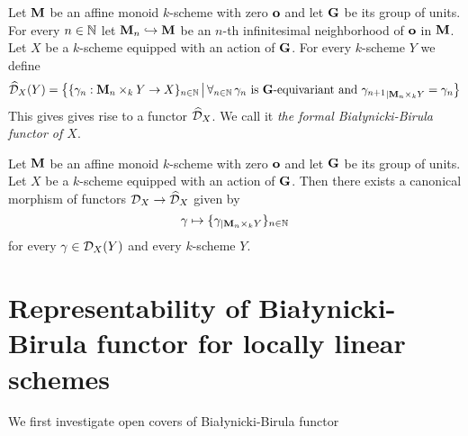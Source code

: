 \begin{definition}
Let $\mathbf{M}$ be an affine monoid $k$-scheme with zero $\mathbf{o}$ and let $\mathbf{G}$ be its group of units. For every $n\in {\mathbb N}$ let $\mathbf{M}_n\hookrightarrow \mathbf{M}$ be an $n$-th infinitesimal neighborhood of $\mathbf{o}$ in $\mathbf{M}$. Let $X$ be a $k$-scheme equipped with an action of $\mathbf{G}$. For every $k$-scheme $Y$ we define
$$\widehat{{\mathcal D}}_X(Y) = \big\{\{\gamma_n:\mathbf{M}_n\times_kY\rightarrow X\}_{n\in {\mathbb N}}\,\big|\,\forall_{n\in {\mathbb N}}\,\gamma_n\mbox{ is }\mathbf{G}\mbox{-equivariant and }{\gamma_{n+1}}_{\mid \mathbf{M}_n\times_kY} = \gamma_n\big\}$$
This gives gives rise to a functor $\widehat{{\mathcal D}}_X$. We call it \textit{the formal Bia{\l}ynicki-Birula functor of $X$}.
\end{definition}

\begin{remark}
Let $\mathbf{M}$ be an affine monoid $k$-scheme with zero $\mathbf{o}$ and let $\mathbf{G}$ be its group of units. Let $X$ be a $k$-scheme equipped with an action of $\mathbf{G}$. Then there exists a canonical morphism of functors ${\mathcal D}_X\rightarrow \widehat{{\mathcal D}}_X$ given by
$$\gamma \mapsto \{\gamma_{\mid \mathbf{M}_n\times_kY}\}_{n\in {\mathbb N}}$$
for every $\gamma \in {\mathcal D}_X(Y)$ and every $k$-scheme $Y$.
\end{remark}

\section{Representability of Bia{\l}ynicki-Birula functor for locally linear schemes}
\noindent
We first investigate open covers of Bia{\l}ynicki-Birula functor

